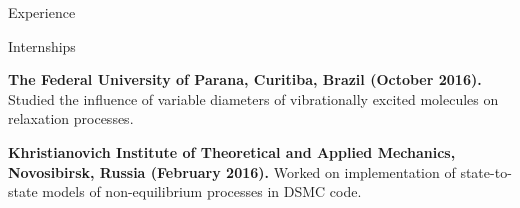 \documentclass{resume} %
\begin{document}
\begin{rSection}{Experience}
\begin{rSubsection}{Internships}{}{}{}
\item \textbf{The Federal University of Parana, Curitiba, Brazil (October 2016).}
Studied the influence of variable diameters of vibrationally excited molecules on relaxation processes.

\item \textbf{Khristianovich Institute of Theoretical and Applied Mechanics, Novosibirsk, Russia (February 2016).}
Worked on implementation of state-to-state models of non-equilibrium processes in DSMC code.
\end{rSubsection}





\end{rSection}
\end{document}
